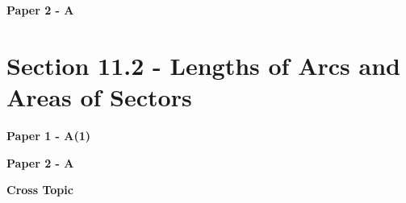 \documentclass[12pt, a4paper]{article}
\begin{document}
\textbf{Paper 2 - A}
\begin{enumx}[label=\arabic*.,start=1]
\item {}\label{DSE2012P-CoreP2-Q11} 
\end{enumx}




\section*{Section 11.2 - Lengths of Arcs and Areas of Sectors}\label{section:2-11-2}

\textbf{Paper 1 - A(1)}
\begin{enumx}[label=\arabic*.,start=2]
\item {}\label{DSE2015-CoreP1-Q09} 
\end{enumx}
\textbf{Paper 2 - A}
\begin{enumx}[label=\arabic*.,start=3]
\item {}\label{DSE2012P-CoreP2-Q15} 
\item {}\label{DSE2012-CoreP2-Q16} 
\item {}\label{DSE2012-CoreP2-Q21} 
\item {}\label{DSE2014-CoreP2-Q10} 
\item {}\label{DSE2016-CoreP2-Q19} 
\item {}\label{DSE2021-CoreP2-Q17} 
\item {}\label{DSE2024-CoreP2-Q15} 
\end{enumx}
\textbf{Cross Topic}
\begin{enumx}[label=\arabic*.,start=10]
\item {}\label{DSE2013-CoreP2-Q16} 
\end{enumx}




\end{document}
